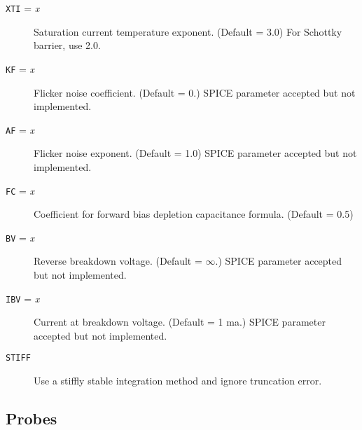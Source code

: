 \begin{description}
\item[{\tt XTI} = {\it x}] Saturation current temperature exponent.
(Default = 3.0)  For Schottky barrier, use 2.0.

\item[{\tt KF} = {\it x}] Flicker noise coefficient.  (Default = 0.)  SPICE
parameter accepted but not implemented.

\item[{\tt AF} = {\it x}] Flicker noise exponent.  (Default = 1.0)  SPICE
parameter accepted but not implemented.

\item[{\tt FC} = {\it x}] Coefficient for forward bias depletion capacitance
formula. (Default = 0.5)

\item[{\tt BV} = {\it x}] Reverse breakdown voltage.  (Default = $\infty$.)
SPICE parameter accepted but not implemented.

\item[{\tt IBV} = {\it x}] Current at breakdown voltage. (Default = 1 ma.)
SPICE parameter accepted but not implemented.

\item[{\tt STIFF}] Use a stiffly stable integration method and
ignore truncation error.

\end{description}
\subsection{Probes}

